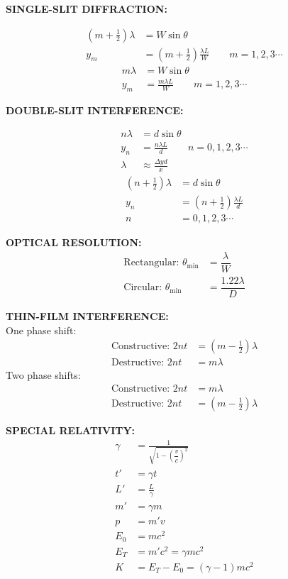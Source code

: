 \documentclass[11pt]{article}
\newcommand{\sk}{\quad\quad}
\begin{document}
\begin{multicols*}{3}
  
  \textbf{SINGLE-SLIT DIFFRACTION:}

  \begin{align*}
    \left(m+\frac12\right)\lambda&=W\sin\theta\\
    y_m&=\left(m+\frac12\right)\frac{\lambda L}W\sk
    m = 1,2,3\cdots
  \end{align*}
  \begin{align*}
    m\lambda &= W\sin\theta\\
    y_m &= \frac{m\lambda L}W\sk
    m = 1,2,3\cdots
  \end{align*}
  \columnbreak
  
  \textbf{DOUBLE-SLIT INTERFERENCE:}

  \begin{align*}
    n\lambda &= d\sin\theta\\
    y_n &= \frac{n\lambda L}d\sk
    n =0,1,2,3\cdots\\
    \lambda &\approx\frac{\Delta yd}x
  \end{align*}
  \begin{align*}
    \left(n+\frac12\right)\lambda &= d\sin\theta\\
    y_n&=\left(n+\frac12\right)\frac{\lambda L}d\\
    n &=0,1,2,3\cdots
  \end{align*}
  
  \textbf{OPTICAL RESOLUTION:}
  \begin{align*}
  \text{Rectangular: }\theta_\text{min} &= \dfrac\lambda W\\
  \text{Circular: }\theta_\text{min} &= \dfrac{1.22\lambda}D
  \end{align*}
  
  \textbf{THIN-FILM INTERFERENCE:}\\
  One phase shift:
  \begin{align*}
    \text{Constructive: }2nt&=\left(m-\frac12\right)\lambda\\
    \text{Destructive: }2nt&=m\lambda
  \end{align*}
  Two phase shifts:
  \begin{align*}
    \text{Constructive: }2nt&=m\lambda\\
    \text{Destructive: }2nt&=\left(m-\frac12\right)\lambda
  \end{align*}
  
  \textbf{SPECIAL RELATIVITY:}
  \begin{align*}
    \gamma &= \frac1{\sqrt{1-\left(\dfrac vc\right)^2}}\\
    t' &= \gamma t\\
    L' &= \frac L\gamma\\
    m' &= \gamma m\\
    p &=m'v\\
    E_0 &= mc^2\\
    E_T &= m'c^2 = \gamma mc^2\\
    K &= E_T-E_0=(\gamma-1)mc^2
  \end{align*}
  \columnbreak
  

\end{multicols*}
\end{document}
